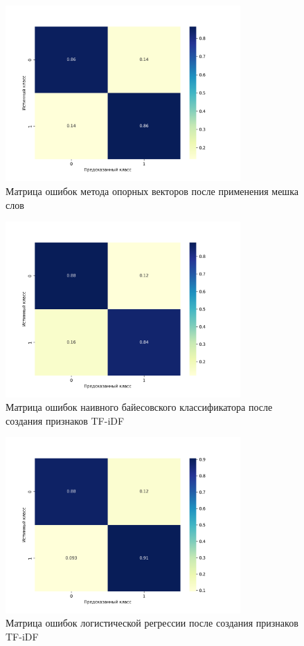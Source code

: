 \documentclass[bachelor, och, coursework]{SCWorks}
\begin{document}
        \begin{figure}[H]
            \centering
            \includegraphics[width=0.8\textwidth]{pic/BOW-SVM.png}
            \caption{Матрица ошибок метода опорных векторов после применения мешка слов}
        \end{figure}

        \begin{figure}[H]
            \centering
            \includegraphics[width=0.8\textwidth]{pic/TFIDF-NB.png}
            \caption{Матрица ошибок наивного байесовского классификатора после создания признаков TF-iDF}
        \end{figure}

        \begin{figure}[H]
            \centering
            \includegraphics[width=0.8\textwidth]{pic/TFIDF-LR.png}
            \caption{Матрица ошибок логистической регрессии после создания признаков TF-iDF}
        \end{figure}
\end{document}
